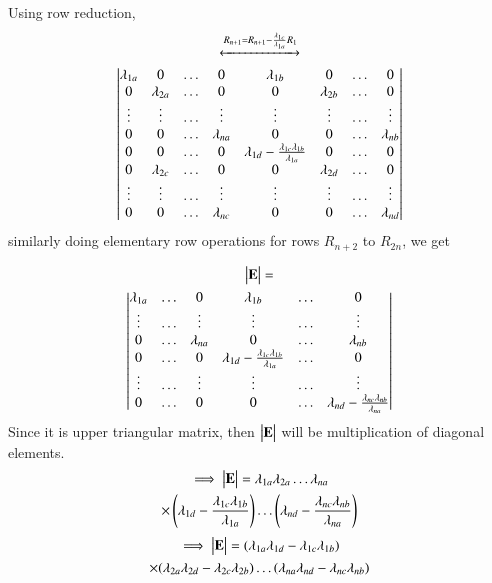 \documentclass[journal,12pt,twocolumn]{IEEEtran}
\begin{document}
Using row reduction,
\begin{multline}
    \xleftrightarrow[]{R_{n+1}=R_{n+1}-\frac{\lambda_{1c}}{\lambda_{1a}}R_1}\\
    \begin{vmatrix}\lambda_{1a}&0&\dots&0&\lambda_{1b}&0&\dots&0\\0&\lambda_{2a}&\dots&0&0&\lambda_{2b}&\dots&0\\\vdots&\vdots&\dots&\vdots&\vdots&\vdots&\dots&\vdots\\0&0&\dots&\lambda_{na}&0&0&\dots&\lambda_{nb}\\0&0&\dots&0&\lambda_{1d}-\frac{\lambda_{1c}\lambda_{1b}}{\lambda_{1a}}&0&\dots&0\\0&\lambda_{2c}&\dots&0&0&\lambda_{2d}&\dots&0\\\vdots&\vdots&\dots&\vdots&\vdots&\vdots&\dots&\vdots\\0&0&\dots&\lambda_{nc}&0&0&\dots&\lambda_{nd}\end{vmatrix}
\end{multline}
similarly doing elementary row operations for rows $R_{n+2}$ to $R_{2n}$, we get

\begin{multline}
    \begin{vmatrix}\mathbf{E}\end{vmatrix}=\\\begin{vmatrix}\lambda_{1a}&\dots&0&\lambda_{1b}&\dots&0\\\vdots&\dots&\vdots&\vdots&\dots&\vdots\\0&\dots&\lambda_{na}&0&\dots&\lambda_{nb}\\0&\dots&0&\lambda_{1d}-\frac{\lambda_{1c}\lambda_{1b}}{\lambda_{1a}}&\dots&0\\\vdots&\dots&\vdots&\vdots&\dots&\vdots\\0&\dots&0&0&\dots&\lambda_{nd}-\frac{\lambda_{nc}\lambda_{nb}}{\lambda_{na}}\end{vmatrix}
\end{multline}
Since it is upper triangular matrix, then $\begin{vmatrix}\mathbf{E}\end{vmatrix}$ will be multiplication of diagonal elements.
\begin{multline}
    \implies\begin{vmatrix}\mathbf{E}\end{vmatrix}=\lambda_{1a}\lambda_{2a}\dots\lambda_{na}\\\times\left(\lambda_{1d}-\frac{\lambda_{1c}\lambda_{1b}}{\lambda_{1a}}\right)\dots\left(\lambda_{nd}-\frac{\lambda_{nc}\lambda_{nb}}{\lambda_{na}}\right)
\end{multline}
\begin{multline}
    \implies\begin{vmatrix}\mathbf{E}\end{vmatrix}=(\lambda_{1a}\lambda_{1d}-\lambda_{1c}\lambda_{1b})\\\times(\lambda_{2a}\lambda_{2d}-\lambda_{2c}\lambda_{2b})\dots(\lambda_{na}\lambda_{nd}-\lambda_{nc}\lambda_{nb})\label{detE}
\end{multline}
\end{document}
